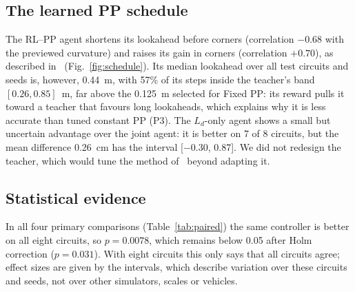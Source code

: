 \documentclass[10pt,twocolumn,twoside]{article}
\newcommand{\Ld}{L_d}
\begin{document}
\subsection{The learned PP schedule}

The RL--PP agent shortens its lookahead before corners (correlation $-0.68$ with
the previewed curvature) and raises its gain in corners (correlation $+0.70$), as
described in~\cite{elgouhary2026} (Fig.~\ref{fig:schedule}). Its median
lookahead over all test circuits and seeds is, however, 0.44~m, with 57\% of its
steps inside the teacher's band $[0.26,0.85]$~m, far above the 0.125~m selected
for Fixed PP: its reward pulls it toward a teacher that favours long lookaheads,
which explains why it is less accurate than tuned constant PP (P3). The
$\Ld$-only agent shows a small but uncertain advantage over the joint agent: it
is better on 7 of 8 circuits, but the mean difference 0.26~cm has the interval
[$-0.30$, 0.87]. We did not redesign the teacher, which would tune the method
of~\cite{elgouhary2026} beyond adapting it.

\subsection{Statistical evidence}

In all four primary comparisons (Table~\ref{tab:paired}) the same controller is
better on all eight circuits, so $p=0.0078$, which remains below 0.05 after Holm correction ($p=0.031$).
With eight circuits this only says that all circuits agree; effect sizes are
given by the intervals, which describe variation over these circuits and seeds,
not over other simulators, scales or vehicles.
\end{document}
